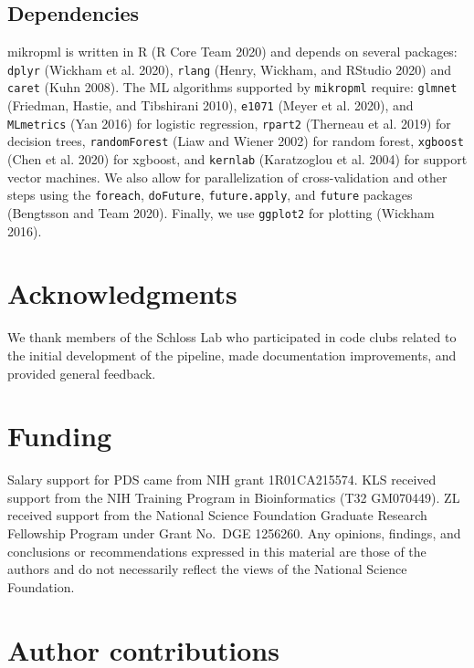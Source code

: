 \documentclass[
]{article}
\begin{document}
\hypertarget{dependencies}{%
\subsection{Dependencies}\label{dependencies}}

mikropml is written in R (R Core Team 2020) and depends on several
packages: \texttt{dplyr} (Wickham et al. 2020), \texttt{rlang} (Henry,
Wickham, and RStudio 2020) and \texttt{caret} (Kuhn 2008). The ML
algorithms supported by \texttt{mikropml} require: \texttt{glmnet}
(Friedman, Hastie, and Tibshirani 2010), \texttt{e1071} (Meyer et al.
2020), and \texttt{MLmetrics} (Yan 2016) for logistic regression,
\texttt{rpart2} (Therneau et al. 2019) for decision trees,
\texttt{randomForest} (Liaw and Wiener 2002) for random forest,
\texttt{xgboost} (Chen et al. 2020) for xgboost, and \texttt{kernlab}
(Karatzoglou et al. 2004) for support vector machines. We also allow for
parallelization of cross-validation and other steps using the
\texttt{foreach}, \texttt{doFuture}, \texttt{future.apply}, and
\texttt{future} packages (Bengtsson and Team 2020). Finally, we use
\texttt{ggplot2} for plotting (Wickham 2016).

\hypertarget{acknowledgments}{%
\section{Acknowledgments}\label{acknowledgments}}

We thank members of the Schloss Lab who participated in code clubs
related to the initial development of the pipeline, made documentation
improvements, and provided general feedback.

\hypertarget{funding}{%
\section{Funding}\label{funding}}

Salary support for PDS came from NIH grant 1R01CA215574. KLS received
support from the NIH Training Program in Bioinformatics (T32 GM070449).
ZL received support from the National Science Foundation Graduate
Research Fellowship Program under Grant No.~DGE 1256260. Any opinions,
findings, and conclusions or recommendations expressed in this material
are those of the authors and do not necessarily reflect the views of the
National Science Foundation.

\hypertarget{author-contributions}{%
\section{Author contributions}\label{author-contributions}}
\end{document}
